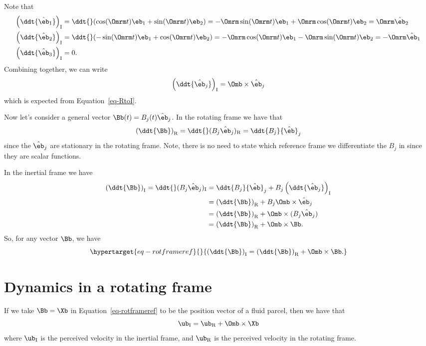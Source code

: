 \documentclass[
  letterpaper,
  twocolumn,
  landscape]{report}
\begin{document}
\begin{tcolorbox}
Note that \begin{align*}
\left(\ddt{\hat\eb_1} \right)_\mathrm{I} &= \ddt{}(\cos(\Omrm t)\eb_1 + \sin(\Omrm t)\eb_2) = -\Omrm\sin(\Omrm t)\eb_1 + \Omrm\cos(\Omrm t)\eb_2 = \Omrm\hat\eb_2\\
\left(\ddt{\hat\eb_2} \right)_\mathrm{I} &= \ddt{}(-\sin(\Omrm t)\eb_1 + \cos(\Omrm t)\eb_2) = -\Omrm\cos(\Omrm t)\eb_1 - \Omrm\sin(\Omrm t)\eb_2 = -\Omrm\hat\eb_1\\
\left(\ddt{\hat\eb_3} \right)_\mathrm{I} &= 0.
\end{align*} Combining together, we can write
\[ \left( \ddt{\hat\eb_j}\right)_\mathrm{I} = \Omb\times\hat\eb_j \]
which is expected from Equation~\ref{eq-RtoI}.

\end{tcolorbox}

Now let's consider a general vector \(\Bb(t)=B_j(t){\hat\eb}_j\). In the
rotating frame we have that
\[ \left( \ddt{\Bb}\right)_\mathrm{R} = \ddt{}(B_j{\hat\eb}_j)_\mathrm{R} = \ddt{B_j}{\hat\eb}_j \]
since the \({\hat\eb}_j\) are stationary in the rotating frame. Note,
there is no need to state which reference frame we differentiate the
\(B_j\) in since they are scalar functions.

In the inertial frame we have \begin{align*}
\left( \ddt{\Bb}\right)_\mathrm{I} = \ddt{}(B_j{\hat\eb}_j)_\mathrm{I} &=  \ddt{B_j}{\hat\eb}_j + B_j\left(\ddt{\hat\eb_j}\right)_\mathrm{I}\\
& =  \left(\ddt{\Bb}\right)_\mathrm{R} + B_j\Omb\times\hat{\eb}_j\\
& =  \left(\ddt{\Bb}\right)_\mathrm{R} + \Omb\times(B_j\hat{\eb}_j)\\
& =  \left(\ddt{\Bb}\right)_\mathrm{R}  + \Omb\times\Bb.
\end{align*} So, for any vector \(\Bb\), we have
\begin{equation}\protect\hypertarget{eq-rotframeref}{}{\left( \ddt{\Bb}\right)_\mathrm{I} =  \left(\ddt{\Bb}\right)_\mathrm{R}  + \Omb\times\Bb. }\label{eq-rotframeref}\end{equation}

\hypertarget{dynamics-in-a-rotating-frame}{%
\section{Dynamics in a rotating
frame}\label{dynamics-in-a-rotating-frame}}

If we take \(\Bb=\Xb\) in Equation~\ref{eq-rotframeref} to be the
position vector of a fluid parcel, then we have that
\[ \ub_\mathrm{I} = \ub_\mathrm{R} +  \Omb\times\Xb \] where
\(\ub_\mathrm{I}\) is the perceived velocity in the inertial frame, and
\(\ub_\mathrm{R}\) is the perceived velocity in the rotating frame.
\end{document}
